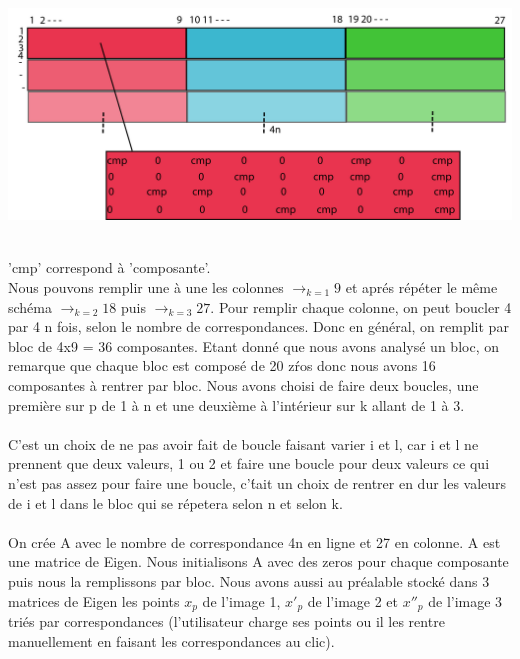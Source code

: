 \documentclass[a4paper,11pt,fleqn]{report}
\begin{document}
\\
\begin{center}\includegraphics[width=1.2\textwidth]{./schema2.png}\end{center}
\\
'cmp' correspond \`a 'composante'.\\ Nous pouvons remplir une \`a une les colonnes $\to_{k=1} 9$ et apr\'es r\'ep\'eter le m\^eme sch\'ema $\to_{k=2} 18$ puis $\to_{k=3} 27$. Pour remplir  chaque colonne, on peut boucler 4 par 4 n fois, selon le nombre de correspondances. Donc en g\'en\'eral, on remplit par bloc de 4x9 = 36 composantes. Etant donn\'e que nous avons analys\'e un bloc, on remarque que chaque bloc est compos\'e de 20 z\'ros donc nous avons 16 composantes \`a rentrer par bloc. Nous avons choisi de faire deux boucles, une premi\`ere sur p de 1 \`a n et une deuxi\`eme \`a l'int\'erieur sur k allant de 1 \`a 3.\\\\C'est un choix de ne pas avoir fait de boucle faisant varier i et l, car i et l ne prennent que deux valeurs, 1 ou 2 et faire une boucle pour deux valeurs ce qui n'est pas assez pour faire une boucle, c'\'tait un choix de rentrer en dur les valeurs de i et l dans le bloc qui se r\'epetera selon n et selon k.
\\
\\On cr\'ee A avec le nombre de correspondance 4n en ligne et 27 en colonne. A est une matrice de Eigen. Nous initialisons A avec des zeros pour chaque composante puis nous la remplissons par bloc. Nous avons aussi au pr\'ealable stock\'e dans 3 matrices de Eigen les points $x_p$ de l'image 1, $x'_p$ de l'image 2 et $x''_p$ de l'image 3 tri\'es par correspondances (l'utilisateur charge ses points ou il les rentre manuellement en faisant les correspondances au clic). 

	\\
	\\
	\\
\end{document}
